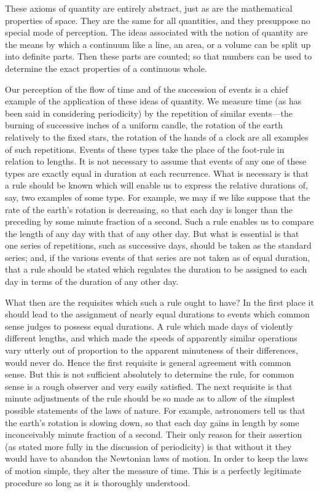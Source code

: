 \documentclass[12pt,leqno]{book}[2005/09/16]
\newcommand{\PageSep}[1]{\ignorespaces}
\begin{document}
These axioms of quantity are entirely abstract,
just as are the mathematical properties
of space. They are the same for all quantities,
and they presuppose no special mode of perception.
The ideas associated with the notion
of quantity are the means by which a continuum
like a line, an area, or a volume can
be split up into definite parts. Then these
parts are counted; so that numbers can be
used to determine the exact properties of a
continuous whole.
\PageSep{247}

Our perception of the flow of time and of
%
the succession of events is a chief example
of the application of these ideas of quantity.
We measure time (as has been said in considering
periodicity) by the repetition of
similar events---the burning of successive
inches of a uniform candle, the rotation of
the earth relatively to the fixed stars, the
rotation of the hands of a clock are all examples
of such repetitions. Events of these
types take the place of the foot-rule in relation
to lengths. It is not necessary to assume
that events of any one of these types are
exactly equal in duration at each recurrence.
What is necessary is that a rule should be
known which will enable us to express the
relative durations of, say, two examples of
some type. For example, we may if we like
suppose that the rate of the earth's rotation
is decreasing, so that each day is longer than
the preceding by some minute fraction of a
second. Such a rule enables us to compare
the length of any day with that of any other
day. But what is essential is that one series
of repetitions, such as successive days, should
be taken as the standard series; and, if the
various events of that series are not taken as
of equal duration, that a rule should be
stated which regulates the duration to be
assigned to each day in terms of the duration
of any other day.
\PageSep{248}

What then are the requisites which such
a rule ought to have? In the first place it
should lead to the assignment of nearly equal
durations to events which common sense
judges to possess equal durations. A rule
which made days of violently different lengths,
and which made the speeds of apparently
similar operations vary utterly out of proportion
to the apparent minuteness of their
differences, would never do. Hence the first
requisite is general agreement with common
sense. But this is not sufficient absolutely
to determine the rule, for common sense is a
rough observer and very easily satisfied. The
next requisite is that minute adjustments of
the rule should be so made as to allow of the
simplest possible statements of the laws of
nature. For example, astronomers tell us
that the earth's rotation is slowing down, so
that each day gains in length by some inconceivably
minute fraction of a second. Their
only reason for their assertion (as stated more
fully in the discussion of periodicity) is that
without it they would have to abandon the
Newtonian laws of motion. In order to keep
%
the laws of motion simple, they alter the
measure of time. This is a perfectly legitimate
procedure so long as it is thoroughly
understood.
\end{document}
